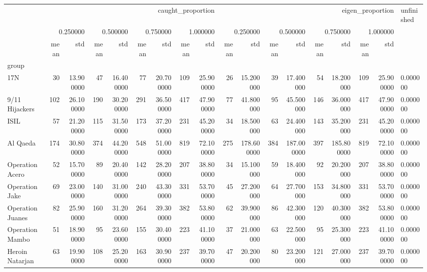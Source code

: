 \begin{tabular}{lrrrrrrrrrrrrrrrrl}
 & \multicolumn{8}{r}{caught_proportion} & \multicolumn{8}{r}{eigen_proportion} & unfinished \\
 & \multicolumn{2}{r}{0.250000} & \multicolumn{2}{r}{0.500000} & \multicolumn{2}{r}{0.750000} & \multicolumn{2}{r}{1.000000} & \multicolumn{2}{r}{0.250000} & \multicolumn{2}{r}{0.500000} & \multicolumn{2}{r}{0.750000} & \multicolumn{2}{r}{1.000000} &  \\
 & mean & std & mean & std & mean & std & mean & std & mean & std & mean & std & mean & std & mean & std &  \\
group &  &  &  &  &  &  &  &  &  &  &  &  &  &  &  &  &  \\
17N & 30 & 13.900000 & 47 & 16.400000 & 77 & 20.700000 & 109 & 25.900000 & 26 & 15.200000 & 39 & 17.400000 & 54 & 18.200000 & 109 & 25.900000 & 0.000000 \\
9/11 Hijackers & 102 & 26.100000 & 190 & 30.200000 & 291 & 36.500000 & 417 & 47.900000 & 77 & 41.800000 & 95 & 45.500000 & 146 & 36.000000 & 417 & 47.900000 & 0.000000 \\
ISIL & 57 & 21.200000 & 115 & 31.500000 & 173 & 37.200000 & 231 & 45.200000 & 34 & 18.500000 & 63 & 24.400000 & 143 & 35.200000 & 231 & 45.200000 & 0.000000 \\
Al Qaeda & 174 & 30.800000 & 374 & 44.200000 & 548 & 51.000000 & 819 & 72.100000 & 275 & 178.600000 & 384 & 187.000000 & 397 & 185.800000 & 819 & 72.100000 & 0.000000 \\
Operation Acero & 52 & 15.700000 & 89 & 20.400000 & 142 & 28.200000 & 207 & 38.800000 & 34 & 15.100000 & 59 & 18.400000 & 92 & 20.200000 & 207 & 38.800000 & 0.000000 \\
Operation Jake & 69 & 23.000000 & 140 & 31.000000 & 240 & 43.300000 & 331 & 53.700000 & 45 & 27.200000 & 64 & 27.700000 & 153 & 34.800000 & 331 & 53.700000 & 0.000000 \\
Operation Juanes & 82 & 25.900000 & 160 & 31.200000 & 264 & 39.300000 & 382 & 53.800000 & 62 & 39.900000 & 86 & 42.300000 & 120 & 40.300000 & 382 & 53.800000 & 0.000000 \\
Operation Mambo & 51 & 18.900000 & 95 & 23.600000 & 155 & 30.400000 & 223 & 41.100000 & 37 & 21.000000 & 63 & 22.500000 & 95 & 25.300000 & 223 & 41.100000 & 0.000000 \\
Heroin Natarjan & 63 & 19.900000 & 108 & 25.200000 & 163 & 30.900000 & 237 & 39.700000 & 47 & 20.200000 & 80 & 23.200000 & 121 & 27.000000 & 237 & 39.700000 & 0.000000 \\

\end{tabular}
